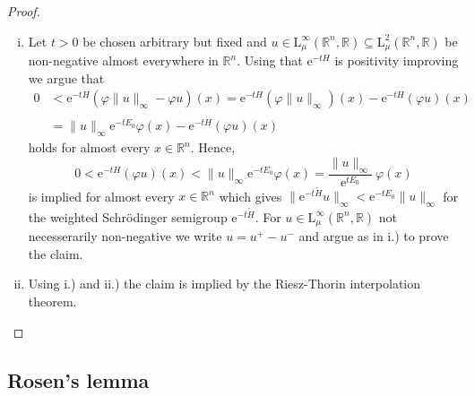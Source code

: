 \documentclass[12pt,longbibliography]{article}
\def\N{\mathbb{N}}
\def\R{\mathbb{R}}
\theoremstyle{definition}
\theoremstyle{remark}
\theoremstyle{example}
\begin{document}
\begin{proof}
\begin{enumerate}[i.)]
\begin{enumerate}[a)]
\begin{align*}
\end{align*}
\item Now let $u \in \mathrm{L}_{\mu}^{1}(\R^{n}, \R)$. We define a sequence
$u_{k} = 1_{\{ u \leq k \}} \ u$ for $k \in \N$. Mind that $u_{k}$ is a bounded function on $\R^{n}$ and therefore is contained in 
$\mathrm{L}_{\mu}^{2}(\R^{n}, \R)$ since $\mu$ is a probability measure. Furthermore $(u_{k})$ converges to $u$ in 
$\mathrm{L}_{\mu}^{1}(\R^{n})$ by Lebesgue's theorem 
since $u_{k}$ converges pointwise almost everywhere to $u$ in $\R^{n}$ and 
$|u_{k} - u| \leq 2|u| \in \mathrm{L}_{\mu}^{1}(\R^{n})$ is true as well. So using b) we conclude that 
$(\mathrm{e}^{-t\tilde{H}}u_{k})$ is a Cauchy sequence in $\mathrm{L}_{\mu}^{1}(\R^{n})$. Hence there 
exists a unique and bounded extension of $\mathrm{e}^{-t\tilde{H}}$ to $\mathrm{L}_{\mu}^{1}(\R^{n})$ that 
proves the claim.
\end{enumerate}
\item Let $t > 0$ be chosen arbitrary but fixed and 
$u \in \mathrm{L}_{\mu}^{\infty}(\R^{n}, \R) \subseteq \mathrm{L}_{\mu}^{2}(\R^{n}, \R)$ be non-negative 
almost everywhere in $\R^{n}$. Using that $\mathrm{e}^{-tH}$ is positivity improving we argue that
\begin{align*}
0 & < \mathrm{e}^{-tH} \left( \varphi \| u \|_{\infty} - \varphi u \right) (x) = 
\mathrm{e}^{-tH} \left( \varphi \| u \|_{\infty}\right) (x) - \mathrm{e}^{-tH} \left( \varphi u \right) (x) \\
\ \\
& =
\| u \|_{\infty} \mathrm{e}^{-tE_{0}} \varphi(x) - \mathrm{e}^{-tH} \left( \varphi u \right) (x) 
\end{align*}
holds for almost every $x \in \R^{n}$. Hence,
$$
0 < \mathrm{e}^{-tH} \left( \varphi u \right) (x) < \| u \|_{\infty} \mathrm{e}^{-tE_{0}} \varphi(x) = 
\frac{\| u \|_{\infty}}{\mathrm{e}^{tE_{0}}} \ \varphi(x)
$$
is implied for almost every $x \in \R^{n}$ which gives $\| \mathrm{e}^{-t\tilde{H}} u \|_{\infty} < \mathrm{e}^{-tE_{0}} \| u \|_{\infty}$
for the weighted Schrödinger semigroup $\mathrm{e}^{-t\tilde{H}}$. For $u \in \mathrm{L}_{\mu}^{\infty}(\R^{n}, \R)$ not necesserarily
non-negative we write $u = u^{+} - u^{-}$ and argue as in i.) to prove the claim.
\item Using i.) and ii.) the claim is implied by the Riesz-Thorin interpolation theorem.
\end{enumerate}
\end{proof}


\subsection{Rosen's lemma} \label{Rosen_lemma}
\end{document}
